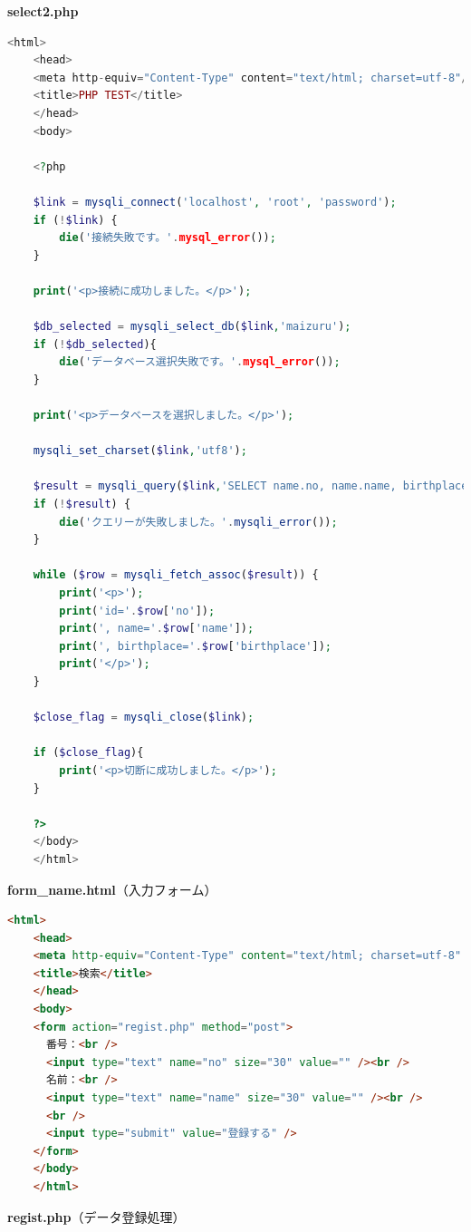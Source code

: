 \textbf{select2.php}
\begin{lstlisting}[language=php]
    <html>
    <head>
    <meta http-equiv="Content-Type" content="text/html; charset=utf-8"/>
    <title>PHP TEST</title>
    </head>
    <body>
    
    <?php
    
    $link = mysqli_connect('localhost', 'root', 'password');
    if (!$link) {
        die('接続失敗です。'.mysql_error());
    }
    
    print('<p>接続に成功しました。</p>');
    
    $db_selected = mysqli_select_db($link,'maizuru');
    if (!$db_selected){
        die('データベース選択失敗です。'.mysql_error());
    }
    
    print('<p>データベースを選択しました。</p>');
    
    mysqli_set_charset($link,'utf8');
    
    $result = mysqli_query($link,'SELECT name.no, name.name, birthplace.birthplace FROM name inner join birthplace on name.name=birthplace.name');
    if (!$result) {
        die('クエリーが失敗しました。'.mysqli_error());
    }
    
    while ($row = mysqli_fetch_assoc($result)) {
        print('<p>');
        print('id='.$row['no']);
        print(', name='.$row['name']);
        print(', birthplace='.$row['birthplace']);
        print('</p>');
    }
    
    $close_flag = mysqli_close($link);
    
    if ($close_flag){
        print('<p>切断に成功しました。</p>');
    }
    
    ?>
    </body>
    </html>
\end{lstlisting}

\textbf{form\_name.html}（入力フォーム）

\begin{lstlisting}[language=html]
    <html>
    <head>
    <meta http-equiv="Content-Type" content="text/html; charset=utf-8" />
    <title>検索</title>
    </head>
    <body>
    <form action="regist.php" method="post">
      番号：<br />
      <input type="text" name="no" size="30" value="" /><br />
      名前：<br />
      <input type="text" name="name" size="30" value="" /><br />
      <br />
      <input type="submit" value="登録する" />
    </form>
    </body>
    </html>
\end{lstlisting}

\textbf{regist.php}（データ登録処理）

